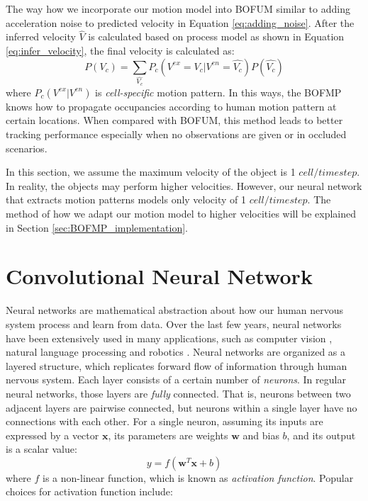 The way how we incorporate our motion model into BOFUM similar to adding acceleration noise to predicted velocity in Equation \ref{eq:adding_noise}. After the inferred velocity $\hat{V}$ is calculated based on process model as shown in Equation \ref{eq:infer_velocity}, the final velocity is calculated as:
\begin{equation}
P(V_c) = \sum_{\hat{V_c}}{P_c(V^{ex}=V_c|V^{en}=\hat{V_c})P(\hat{V_c})} \label{eq:motion_pattern}
\end{equation}
where $P_c(V^{ex}|V^{en})$ is \textit{cell-specific} motion pattern. In this ways, the BOFMP knows how to propagate occupancies according to human motion pattern at certain locations. When compared with BOFUM, this method leads to better tracking performance especially when no observations are given or in occluded scenarios.

In this section, we assume the maximum velocity of the object is 1 $cell/timestep$. In reality, the objects may perform higher velocities. However, our neural network that extracts motion patterns models only velocity of 1 $cell/timestep$. The method of how we adapt our motion model to higher velocities will be explained in Section \ref{sec:BOFMP_implementation}.

\section{Convolutional Neural Network} \label{sec:cnn}

Neural networks are mathematical abstraction about how our human nervous system process and learn from data. Over the last few years, neural networks have been extensively used in many applications, such as computer vision \citep{russakovsky2015imagenet}, natural language processing \citep{cho2014learning} and robotics \citep{levine2016learning}. Neural networks are organized as a layered structure, which replicates forward flow of information through human nervous system. Each layer consists of a certain number of \textit{neurons}. In regular neural networks, those layers are \textit{fully} connected. That is, neurons between two adjacent layers are pairwise connected, but neurons within a single layer have no connections with each other. For a single neuron, assuming its inputs are expressed by a vector $\mathbf{x}$, its parameters are weights $\mathbf{w}$ and bias $b$, and its output is a scalar value:
\begin{equation}
y = f(\mathbf{w}^T \mathbf{x} + b)
\end{equation}
where $f$ is a non-linear function, which is known as \textit{activation function}. Popular choices for activation function include:

